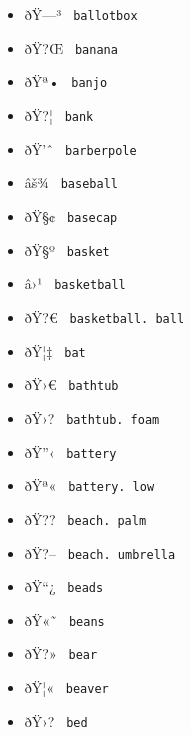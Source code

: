 \begin{itemize}
\item
  \label{symbol-ballotbox}{{ ðŸ---³ }
  \texttt{\ ballotbox\ }}
\item
  \label{symbol-banana}{{ ðŸ?Œ } \texttt{\ banana\ }}
\item
  \label{symbol-banjo}{{ ðŸª• } \texttt{\ banjo\ }}
\item
  \label{symbol-bank}{{ ðŸ?¦ } \texttt{\ bank\ }}
\item
  \label{symbol-barberpole}{{ ðŸ'ˆ }
  \texttt{\ barberpole\ }}
\item
  \label{symbol-baseball}{{ âš¾ } \texttt{\ baseball\ }}
\item
  \label{symbol-basecap}{{ ðŸ§¢ } \texttt{\ basecap\ }}
\item
  \label{symbol-basket}{{ ðŸ§º } \texttt{\ basket\ }}
\item
  \label{symbol-basketball}{{ â›¹ }
  \texttt{\ basketball\ }}
\item
  \label{symbol-basketball.ball}{{ ðŸ?€ }
  \texttt{\ basketball.\ ball\ }}
\item
  \label{symbol-bat}{{ ðŸ¦‡ } \texttt{\ bat\ }}
\item
  \label{symbol-bathtub}{{ ðŸ›€ } \texttt{\ bathtub\ }}
\item
  \label{symbol-bathtub.foam}{{ ðŸ›? }
  \texttt{\ bathtub.\ foam\ }}
\item
  \label{symbol-battery}{{ ðŸ''‹ } \texttt{\ battery\ }}
\item
  \label{symbol-battery.low}{{ ðŸª« }
  \texttt{\ battery.\ low\ }}
\item
  \label{symbol-beach.palm}{{ ðŸ?? }
  \texttt{\ beach.\ palm\ }}
\item
  \label{symbol-beach.umbrella}{{ ðŸ?-- }
  \texttt{\ beach.\ umbrella\ }}
\item
  \label{symbol-beads}{{ ðŸ``¿ } \texttt{\ beads\ }}
\item
  \label{symbol-beans}{{ ðŸ«˜ } \texttt{\ beans\ }}
\item
  \label{symbol-bear}{{ ðŸ?» } \texttt{\ bear\ }}
\item
  \label{symbol-beaver}{{ ðŸ¦« } \texttt{\ beaver\ }}
\item
  \label{symbol-bed}{{ ðŸ›? } \texttt{\ bed\ }}

\end{itemize}
